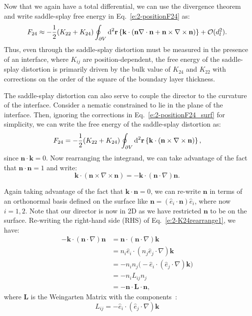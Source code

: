 Now that we again have a total differential, we can use the divergence theorem and write saddle-splay free energy in Eq.~\ref{e:2-positionF24} as:
\begin{equation}
  F_{24} \approx -\frac{1}{2}(K_{22} + K_{24})
  \oint_{\partial V}\textup{d}^2 \mathbf{r} \left \{\mathbf{k} \cdot (\mathbf{n} \nabla \cdot \mathbf{n} + \mathbf{n} \times \nabla \times \mathbf{n}) \right \} + \mathcal{O}(d_l^2). \label{e:2-positionF24_surf}
\end{equation}
Thus, even through the saddle-splay distortion must be measured in the presence of an interface, where $K_{ij}$ are position-dependent, the free energy of the saddle-splay distortion is primarily driven by the bulk value of $K_{24}$ and $K_{22}$ with corrections on the order of the square of the boundary layer thickness.

The saddle-splay distortion can also serve to couple the director to the curvature of the interface.
Consider a nematic constrained to lie in the plane of the interface.
Then, ignoring the corrections in Eq.~\ref{e:2-positionF24_surf} for simplicity, we can write the free energy of the saddle-splay distortion as:
\begin{equation}
  F_{24} = -\frac{1}{2}(K_{22} + K_{24})
  \oint_{\partial V}\textup{d}^2 \mathbf{r} \left \{\mathbf{k} \cdot ( \mathbf{n} \times \nabla \times \mathbf{n}) \right \},\label{e:2-K24PlanDegen}
\end{equation}
since $\mathbf{n} \cdot \mathbf{k} = 0$. Now rearranging the integrand, we can take advantage of the fact that $\mathbf{n} \cdot \mathbf{n}=1$ and write:
\begin{equation}
  \mathbf{k} \cdot ( \mathbf{n} \times \nabla \times \mathbf{n}) = -\mathbf{k} \cdot (\mathbf{n} \cdot \nabla)\mathbf{n}.\label{e:2-K24rearrange1}
\end{equation}

Again taking advantage of the fact that $\mathbf{k} \cdot \mathbf{n} = 0$, we can re-write $\mathbf{n}$ in terms of an orthonormal basis defined on the surface like $\mathbf{n} = (\hat{e}_i \cdot \mathbf{n})\hat{e}_i$, where now $i = 1,2$.
Note that our director is now in 2D as we have restricted $\mathbf{n}$ to be on the surface.
Re-writing the right-hand side (RHS) of Eq.~\ref{e:2-K24rearrange1}, we have:
\begin{align}
  -\mathbf{k} \cdot (\mathbf{n} \cdot \nabla)\mathbf{n}
  &= \mathbf{n} \cdot (\mathbf{n} \cdot \nabla)\mathbf{k} \\
  &= n_i \hat{e}_i \cdot (n_j \hat{e}_j \cdot \nabla) \mathbf{k} \\
  &=- n_i n_j \big ( - \hat{e}_i \cdot ( \hat{e}_j \cdot \nabla) \mathbf{k} \big ) \\
  &= - n_i L_{ij} n_j \\
  &= -\mathbf{n} \cdot \mathbf{L} \cdot \mathbf{n},\label{e:2-K24rearrange2}
\end{align}
where $\mathbf{L}$ is the Weingarten Matrix with the components~\cite{RN23,RN35}:
\begin{equation}
  L_{ij} = - \hat{e}_i \cdot (\hat{e}_j \cdot \nabla) \mathbf{k}\label{e:2-WeingartenMatrix}
\end{equation}

